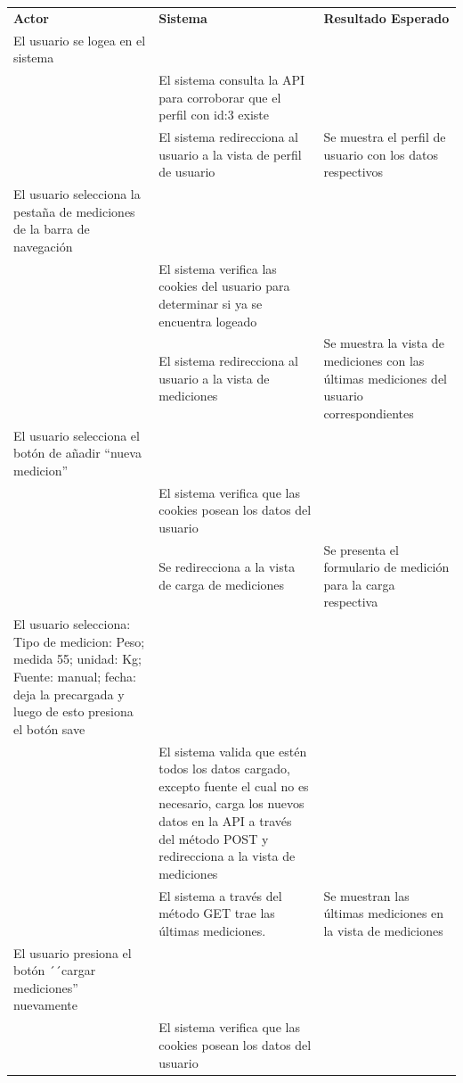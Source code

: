 \documentclass[a4paper,12pt]{article}
\begin{document}
	\begin{longtable}{|p{5cm}|p{5cm}|p{4cm}|}
 
	    \hline \hline \rowcolor[gray]{0.9}
        \multicolumn{3}{||l|}{\textbf{Procedimiento de Prueba - Consultar mediciones}} \\ \hline
	    \hline 
        \rowcolor[gray]{0.9}
	    \textbf{Actor} & \textbf{Sistema}& \textbf{Resultado Esperado} \\  \hline
	    El usuario se logea en el sistema& & \\ \hline
        & El sistema consulta la API para corroborar que el perfil con id:3 existe &\\ \hline
        &  El sistema redirecciona al usuario a la vista de perfil de usuario&Se muestra el perfil de usuario con los datos respectivos\\ \hline
	    El usuario selecciona la pestaña de mediciones de la barra de navegación& &\\ \hline
        & El sistema verifica las cookies del usuario para determinar si ya se encuentra logeado &\\ \hline
        & El sistema redirecciona al usuario a la vista de mediciones&Se muestra la vista de mediciones con las últimas mediciones del usuario correspondientes\\ \hline  
        El usuario selecciona el botón de añadir ``nueva medicion''& &\\ \hline       
        & El sistema verifica que las cookies posean los datos del usuario&\\ \hline       
        & Se redirecciona a la vista de carga de mediciones&Se presenta el formulario de medición para la carga respectiva\\ \hline
        El usuario selecciona: Tipo de medicion: Peso; medida 55; unidad: Kg; Fuente: manual; fecha: deja la precargada y  luego de esto presiona el botón save& &\\ \hline       
        & El sistema valida que estén todos los datos cargado, excepto fuente el cual no es necesario, carga los nuevos datos en la API a través del método POST y redirecciona a la vista de mediciones&\\ \hline       
        &El sistema a través del método GET trae las últimas mediciones. &Se muestran las últimas mediciones en la vista de mediciones\\ \hline
        El usuario presiona el botón ´´cargar mediciones'' nuevamente& &\\ \hline  
        & El sistema verifica que las cookies posean los datos del usuario&\\ \hline       

\end{longtable}
\end{document}
